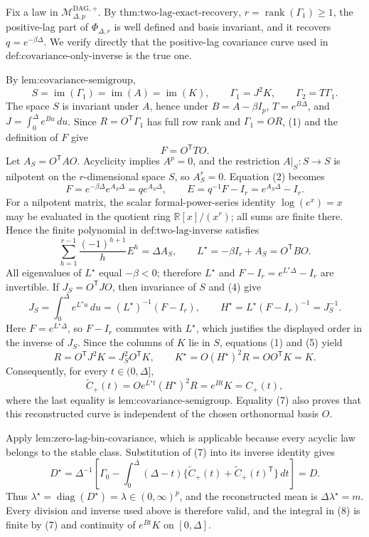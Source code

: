 Fix a law in \(\mathcal M_{\Delta,p}^{\mathrm{DAG},+}\).  By \(\text{thm:two-lag-exact-recovery}\), \(r=\operatorname{rank}(\Gamma_1)\geq1\), the positive-lag part of \(\Phi_{\Delta,r}\) is well defined and basis invariant, and it recovers \(q=e^{-\beta\Delta}\).  We verify directly that the positive-lag covariance curve used in \(\text{def:covariance-only-inverse}\) is the true one.

By \(\text{lem:covariance-semigroup}\),
\[
 S=\operatorname{im}(\Gamma_1)=\operatorname{im}(A)=\operatorname{im}(K),
 \qquad \Gamma_1=J^2K,
 \qquad \Gamma_2=T\Gamma_1.
\tag{1}
\]
The space \(S\) is invariant under \(A\), hence under \(B=A-\beta I_p\), \(T=e^{B\Delta}\), and \(J=\int_0^\Delta e^{Bu}\,du\).  Since \(R=O^{\mathsf T}\Gamma_1\) has full row rank and \(\Gamma_1=OR\), (1) and the definition of \(F\) give
\[
 F=O^{\mathsf T}TO.
\tag{2}
\]
Let \(A_S=O^{\mathsf T}AO\).  Acyclicity implies \(A^p=0\), and the restriction \(A|_S:S\to S\) is nilpotent on the \(r\)-dimensional space \(S\), so \(A_S^r=0\).  Equation (2) becomes
\[
 F=e^{-\beta\Delta}e^{A_S\Delta}=q e^{A_S\Delta},
 \qquad E=q^{-1}F-I_r=e^{A_S\Delta}-I_r.
\tag{3}
\]
For a nilpotent matrix, the scalar formal-power-series identity \(\log(e^x)=x\) may be evaluated in the quotient ring \(\mathbb R[x]/(x^r)\); all sums are finite there.  Hence the finite polynomial in \(\text{def:two-lag-inverse}\) satisfies
\[
 \sum_{h=1}^{r-1}\frac{(-1)^{h+1}}{h}E^h=\Delta A_S,
 \qquad L^\star=-\beta I_r+A_S=O^{\mathsf T}BO.
\tag{4}
\]
All eigenvalues of \(L^\star\) equal \(-\beta<0\); therefore \(L^\star\) and \(F-I_r=e^{L^\star\Delta}-I_r\) are invertible.  If \(J_S=O^{\mathsf T}JO\), then invariance of \(S\) and (4) give
\[
 J_S=\int_0^\Delta e^{L^\star u}\,du
 =(L^\star)^{-1}(F-I_r),
 \qquad H^\star=L^\star(F-I_r)^{-1}=J_S^{-1}.
\tag{5}
\]
Here \(F=e^{L^\star\Delta}\), so \(F-I_r\) commutes with \(L^\star\), which justifies the displayed order in the inverse of \(J_S\).
Since the columns of \(K\) lie in \(S\), equations (1) and (5) yield
\[
 R=O^{\mathsf T}J^2K=J_S^2O^{\mathsf T}K,
 \qquad K^\star=O(H^\star)^2R=OO^{\mathsf T}K=K.
\tag{6}
\]
Consequently, for every \(t\in(0,\Delta]\),
\[
 \widetilde C_{+}(t)
 =Oe^{L^\star t}(H^\star)^2R
 =e^{Bt}K
 =C_{+}(t),
\tag{7}
\]
where the last equality is \(\text{lem:covariance-semigroup}\).  Equality (7) also proves that this reconstructed curve is independent of the chosen orthonormal basis \(O\).

Apply \(\text{lem:zero-lag-bin-covariance}\), which is applicable because every acyclic law belongs to the stable class.  Substitution of (7) into its inverse identity gives
\[
 D^\star=\Delta^{-1}\!\left[\Gamma_0-
 \int_0^\Delta(\Delta-t)
 \{\widetilde C_{+}(t)+\widetilde C_{+}(t)^{\mathsf T}\}\,dt\right]
 =D.
\tag{8}
\]
Thus \(\lambda^\star=\operatorname{diag}(D^\star)=\lambda\in(0,\infty)^p\), and the reconstructed mean is \(\Delta\lambda^\star=m\).  Every division and inverse used above is therefore valid, and the integral in (8) is finite by (7) and continuity of \(e^{Bt}K\) on \([0,\Delta]\).

